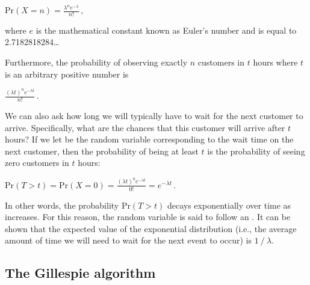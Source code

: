 \begin{center}
$\mathrm{Pr}(X = n) = \frac{\lambda^n e^{-\lambda}}{n!}\,,$
\end{center}

where $e$ is the mathematical constant known as Euler's number and is equal to 2.7182818284…\\

\begin{note}\end{note}

Furthermore, the probability of observing exactly $n$ customers in $t$ hours where $t$ is an arbitrary positive number is

\begin{center}
$\frac{(\lambda t)^n e^{-\lambda t}}{n!}\,.$
\end{center}

We can also ask how long we will typically have to wait for the next customer to arrive. Specifically, what are the chances that this customer will arrive after $t$ hours? If we let  be the random variable corresponding to the wait time on the next customer, then the probability of  being at least $t$ is the probability of seeing zero customers in $t$ hours:

\begin{center}
$\mathrm{Pr}(T > t) = \mathrm{Pr}(X = 0) = \frac{(\lambda t)^0 e^{-\lambda t}}{0!} = e^{-\lambda t}\,.$
\end{center}

In other words, the probability $\mathrm{Pr}(T > t)$ decays exponentially over time as  increases. For this reason, the random variable  is said to follow an . It can be shown that the expected value of the exponential distribution (i.e., the average amount of time we will need to wait for the next event to occur) is $1\mathbin{/}\lambda$.\\

\begin{qbox}\end{qbox}


\FloatBarrier
{}
\subsection{The Gillespie algorithm}


